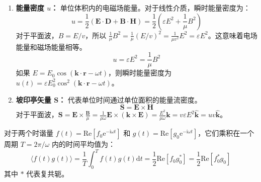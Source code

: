 \documentclass[fontset=none]{ctexart}
\begin{document}
\begin{definition}[电磁波的能量和能流]
\begin{enumerate}
    \item \textbf{能量密度 $u$：} 单位体积内的电磁场能量。对于线性介质，瞬时能量密度为：
    \begin{equation}
        u = \frac{1}{2}(\bm{E} \cdot \bm{D} + \bm{B} \cdot \bm{H}) = \frac{1}{2}(\varepsilon E^2 + \frac{1}{\mu} B^2)
    \end{equation}
    对于平面波，$B = E/v$，所以 $\frac{1}{\mu} B^2 = \frac{1}{\mu} (E/v)^2 = \frac{1}{\mu v^2} E^2 = \varepsilon E^2$。这意味着电场能量和磁场能量相等。
    \begin{equation}
        u = \varepsilon E^2 = \frac{1}{\mu} B^2
    \end{equation}
    如果 $E = E_0 \cos(\bm{k}\cdot\bm{r}-\omega t)$，则瞬时能量密度为 $u(t) = \varepsilon E_0^2 \cos^2(\bm{k}\cdot\bm{r}-\omega t)$。
    
    \item \textbf{坡印亭矢量 $\bm{S}$：} 代表单位时间通过单位面积的能量流密度。
    \begin{equation}
        \bm{S} = \bm{E} \times \bm{H}
    \end{equation}
    对于平面波，$\bm{S} = \bm{E} \times \frac{\bm{B}}{\mu} = \frac{1}{\mu\omega} \bm{E} \times (\bm{k} \times \bm{E}) = \frac{E^2}{\mu\omega} \bm{k} = v\varepsilon E^2 \hat{\bm{k}} = u v \hat{\bm{k}}$。
\end{enumerate}
\end{definition}

\begin{proposition}[时谐场的平均值]
对于两个时谐量 $f(t) = \mathrm{Re}[f_0 \mathrm{e}^{-\mathrm{i}\omega t}]$ 和 $g(t) = \mathrm{Re}[g_0 \mathrm{e}^{-\mathrm{i}\omega t}]$，它们乘积在一个周期 $T=2\pi/\omega$ 内的时间平均值为：
\begin{equation}
\langle f(t)g(t) \rangle = \frac{1}{T}\int_0^T f(t)g(t) \mathrm{d}t = \frac{1}{2}\mathrm{Re}[f_0 g_0^*] = \frac{1}{2}\mathrm{Re}[f_0^* g_0]
\end{equation}
其中 $*$ 代表复共轭。
\end{proposition}
\end{document}
